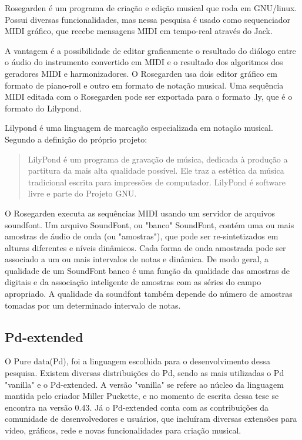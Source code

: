 \documentclass{ppgmus}
\begin{document}
Rosegarden é um programa de criação e edição musical que roda em GNU/linux.
Possui diversas funcionalidades, mas nessa pesquisa é usado como sequenciador
MIDI gráfico, que recebe mensagens MIDI em tempo-real através do Jack.

A vantagem é a possibilidade de editar graficamente o resultado do diálogo entre
o áudio do instrumento convertido em MIDI e o resultado dos algoritmos dos geradores
MIDI e harmonizadores. O Rosegarden usa dois editor gráfico em formato de piano-roll
e outro em formato de notação musical. Uma sequência MIDI editada com o Rosegarden
pode ser exportada para o formato .ly, que é o formato do Lilypond.

Lilypond é uma linguagem de marcação especializada em notação musical. Segundo
a definição do próprio projeto:

\begin{quote}
 LilyPond é um programa de gravação de música, dedicada à produção a partitura da mais alta qualidade possível. 
Ele traz a estética da música tradicional escrita para impressões de computador. LilyPond é software livre e 
parte do Projeto GNU.
\end{quote} 

O Rosegarden executa as sequências MIDI usando um servidor de arquivos soundfont.
Um arquivo SoundFont, ou "banco" SoundFont, contém uma ou mais amostras de áudio de onda (ou "amostras"),
que pode ser re-sintetizados em alturas diferentes e níveis dinâmicos. Cada forma de onda amostrada pode ser
associado a um ou mais intervalos de notas e dinâmica. De modo geral, a qualidade de um
SoundFont banco é uma função da qualidade das amostras de digitais e da associação inteligente
de amostras com as séries do campo apropriado. A qualidade da soundfont também depende do número de amostras
tomadas por um determinado intervalo de notas. 



\subsection{Pd-extended}

O Pure data(Pd), foi a linguagem escolhida para o desenvolvimento dessa pesquisa.
Existem diversas distribuições do Pd, sendo as mais utilizadas o Pd "vanilla" e o Pd-extended.
A versão "vanilla" se refere ao núcleo da linguagem mantida pelo criador Miller Puckette, e no
momento de escrita dessa tese se encontra na versão 0.43. Já o Pd-extended conta com as contribuições
da comunidade de desenvolvedores e usuários, que incluíram diversas extensões para vídeo, gráficos, rede e
novas funcionalidades para criação musical.
\end{document}
